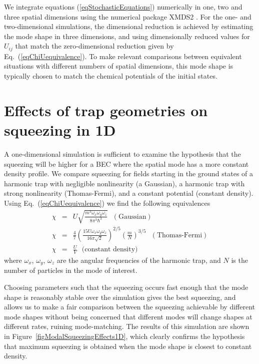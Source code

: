 \documentclass{iopart}
\begin{document}
We integrate equations (\ref{eqStochasticEquations}) numerically in one, two and three spatial dimensions using the numerical package XMDS2 \cite{dennis2013}.  For the one- and two-dimensional simulations, the dimensional reduction is achieved by estimating the mode shape in three dimensions, and using dimensionally reduced values for $U_{ij}$ that match the zero-dimensional reduction given by Eq.~(\ref{eqChiUequivalence}).  To make relevant comparisons between equivalent situations with different numbers of spatial dimensions, this mode shape is typically chosen to match the chemical potentials of the initial states.  

\section{Effects of trap geometries on squeezing in 1D}

A one-dimensional simulation is sufficient to examine the hypothesis that the squeezing will be higher for a BEC where the spatial mode has a more constant density profile.  We compare squeezing for fields starting in the ground states of a harmonic trap with negligible nonlinearity (a Gaussian), a harmonic trap with strong nonlinearity (Thomas-Fermi), and a constant potential (constant density). Using Eq.~(\ref{eqChiUequivalence}) we find the following equivalences
\begin{eqnarray}
\chi &=& U \sqrt{\frac{m^3 \omega_x \omega_y \omega_z}{8 \pi^3 \hbar^3}} \,\,\,\, ({\textrm{Gaussian}}) \\
%
\chi &=& \frac{4}{7} \left( \frac{15 U \omega_x \omega_y \omega_z}{16 \pi \sqrt{2}} \right)^{2/5} \left( \frac{m}{N} \right)^{3/5} \,\,\,\, ({\textrm{Thomas-Fermi}}) \\
%
\chi &=& \frac{U}{V} \,\,\,\, {\textrm{(constant density)}}
\end{eqnarray}
%
where $\omega_x$, $\omega_y$, $\omega_z$ are the angular frequencies of the harmonic trap, and $N$ is the number of particles in the mode of interest.

Choosing parameters such that the squeezing occurs fast enough that the mode shape is reasonably stable over the simulation gives the best squeezing, and allows us to make a fair comparison between the squeezing achievable by different mode shapes without being concerned that different modes will change shapes at different rates, ruining mode-matching. The results of this simulation are shown in Figure~\ref{figModalSqueezingEffects1D}, which clearly confirms the hypothesis that maximum squeezing is obtained when the mode shape is closest to constant density.
\end{document}

